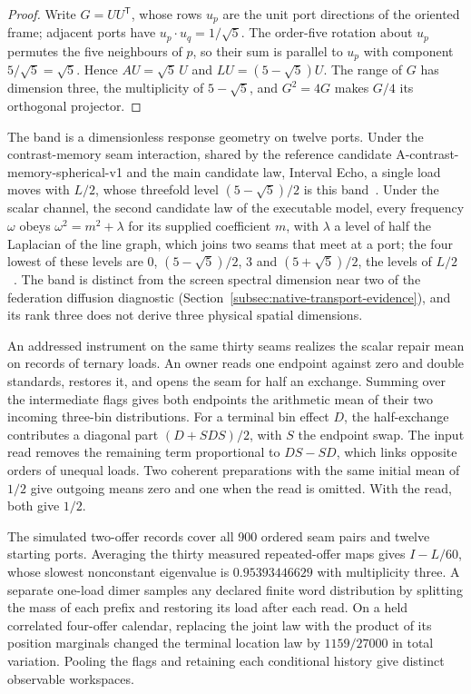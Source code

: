 \documentclass[11pt]{article}
\theoremstyle{remark}
\theoremstyle{plain}
\begin{document}
\begin{proof}
Write \(G=UU^{\mathsf T}\), whose rows \(u_p\) are the unit port directions of
the oriented frame; adjacent ports have \(u_p\cdot u_q=1/\sqrt5\). The
order-five rotation about \(u_p\) permutes the five neighbours of \(p\), so
their sum is parallel to \(u_p\) with component \(5/\sqrt5=\sqrt5\). Hence
\(AU=\sqrt5\,U\) and \(LU=(5-\sqrt5)U\). The range of \(G\) has dimension
three, the multiplicity of \(5-\sqrt5\), and \(G^2=4G\) makes \(G/4\) its
orthogonal projector.
\end{proof}

The band is a dimensionless response geometry on twelve ports. Under the
contrast-memory seam interaction, shared by the reference candidate
A-contrast-memory-spherical-v1 and the main candidate law, Interval Echo, a
single load moves with \(L/2\), whose threefold level \((5-\sqrt5)/2\) is
this band~\cite{ophmodel}. Under the scalar channel, the second candidate
law of the executable model, every frequency
\(\omega\) obeys \(\omega^2=m^2+\lambda\) for its supplied coefficient \(m\),
with \(\lambda\) a level of half the Laplacian of the line graph, which joins
two seams that meet at a port; the four lowest of these levels are \(0\),
\((5-\sqrt5)/2\), \(3\) and \((5+\sqrt5)/2\), the levels of
\(L/2\)~\cite{ophmodel}. The band is
distinct from the screen spectral dimension near two of the federation
diffusion diagnostic (Section~\ref{subsec:native-transport-evidence}), and
its rank three does not derive three physical spatial dimensions.

An addressed instrument on the same thirty seams realizes the scalar
repair mean on records of ternary loads. An owner reads one endpoint
against zero and double standards, restores it, and opens the seam
for half an exchange. Summing over the intermediate flags gives both
endpoints the arithmetic mean of their two incoming three-bin
distributions. For a terminal bin effect $D$, the half-exchange
contributes a diagonal part $(D+SDS)/2$, with $S$ the endpoint swap.
The input read removes the remaining term proportional to $DS-SD$,
which links opposite orders of unequal loads. Two coherent preparations
with the same initial mean of $1/2$ give outgoing means zero and one
when the read is omitted. With the read, both give $1/2$.

The simulated two-offer records cover all 900 ordered seam pairs
and twelve starting ports. Averaging the thirty measured repeated-offer
maps gives $I-L/60$, whose slowest nonconstant eigenvalue is
$0.95393446629$ with multiplicity three. A separate one-load dimer
samples any declared finite word distribution by splitting the mass of
each prefix and restoring its load after each read. On a held correlated
four-offer calendar, replacing the joint law with the product of its
position marginals changed the terminal location law by $1159/27000$ in
total variation. Pooling the flags and retaining each conditional
history give distinct observable workspaces.
\end{document}
